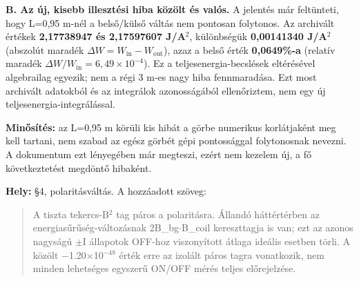 \documentclass[10pt,a4paper]{article}
\begin{document}
{\begin{quote}
\end{quote}
\par

\newpage
{}\par\vspace{2pt}
\noindent{\color{navy}\rule{\linewidth}{0.4pt}}\par\vspace{2pt}
\textbf{B. Az új, kisebb illesztési hiba közölt és valós.} A jelentés már feltünteti, hogy L=0,95 m-nél a belső/külső váltás nem pontosan folytonos. Az archivált értékek \textbf{2,17738947 és 2,17597607 J/A$^2$}, különbségük \textbf{0,00141340 J/A$^2$} (abszolút maradék $\Delta W = W_{\text{in}} - W_{\text{out}}$), azaz a belső érték \textbf{0,0649\%-a} (relatív maradék $\Delta W/W_{\text{in}} = 6{,}49\times 10^{-4}$). Ez a teljesenergia-becslések eltérésével algebrailag egyezik; nem a régi 3 m-es nagy hiba fennmaradása. Ezt most archivált adatokból és az integrálok azonosságából ellenőriztem, nem egy új teljesenergia-integrálással.
\par
\textbf{Minősítés:} az L=0,95 m körüli kis hibát a görbe numerikus korlátjaként meg kell tartani, nem szabad az egész görbét gépi pontossággal folytonosnak nevezni. A dokumentum ezt lényegében már megteszi, ezért nem kezelem új, a fő következtetést megdöntő hibaként.
\par
\vspace{2pt}\par\vspace{0.5pt}
\par
\textbf{Hely:} \S4, polaritásváltás. A hozzáadott szöveg:
\par
\begin{quote}\vspace{-3pt}
A tiszta tekercs-B$^2$ tag páros a polaritásra. Állandó háttértérben az energiasűrűség-változásnak 2B\_bg$\cdot$B\_coil kereszttagja is van; ezt az azonos nagyságú $\pm$I állapotok OFF-hoz viszonyított átlaga ideális esetben törli. A közölt $-$1.20$\times$10$^{-48}$ érték erre az izolált páros tagra vonatkozik, nem minden lehetséges egyszerű ON/OFF mérés teljes előrejelzése.


\end{quote}}
\end{document}
